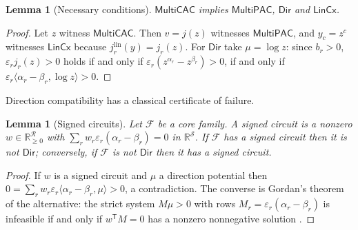 \documentclass[11pt,a4paper]{article}
\theoremstyle{plain}
\newtheorem{lemma}[theorem]{Lemma}
\theoremstyle{definition}
\theoremstyle{remark}
\newcommand{\R}{\mathbb{R}}
\newcommand{\cS}{\mathcal{S}}
\newcommand{\cR}{\mathcal{R}}
\newcommand{\cF}{\mathcal{F}}
\newcommand{\MPAC}{\mathsf{MultiPAC}}
\newcommand{\MCAC}{\mathsf{MultiCAC}}
\newcommand{\DIR}{\mathsf{Dir}}
\newcommand{\LIN}{\mathsf{LinCx}}
\begin{document}
\begin{lemma}[Necessary conditions]\label{lem:necessary}
$\MCAC$ implies $\MPAC$, $\DIR$ and $\LIN$.
\end{lemma}

\begin{proof}
Let $z$ witness $\MCAC$. Then $v=j(z)$ witnesses $\MPAC$, and $y_c=z^{c}$ witnesses $\LIN$ because $j^{\mathrm{lin}}_r(y)=j_r(z)$. For $\DIR$ take $\mu=\log z$: since $b_r>0$, $\varepsilon_rj_r(z)>0$ holds if and only if $\varepsilon_r(z^{\alpha_r}-z^{\beta_r})>0$, if and only if $\varepsilon_r\langle\alpha_r-\beta_r,\log z\rangle>0$.
\end{proof}

Direction compatibility has a classical certificate of failure.

\begin{lemma}[Signed circuits]\label{lem:circuit}
Let $\cF$ be a core family. A \emph{signed circuit} is a nonzero $w\in\R_{\ge0}^{\cR}$ with $\sum_rw_r\varepsilon_r(\alpha_r-\beta_r)=0$ in $\R^{\cS}$. If $\cF$ has a signed circuit then it is not $\DIR$; conversely, if $\cF$ is not $\DIR$ then it has a signed circuit.
\end{lemma}

\begin{proof}
If $w$ is a signed circuit and $\mu$ a direction potential then $0=\sum_rw_r\varepsilon_r\langle\alpha_r-\beta_r,\mu\rangle>0$, a contradiction. The converse is Gordan's theorem of the alternative: the strict system $M\mu>0$ with rows $M_r=\varepsilon_r(\alpha_r-\beta_r)$ is infeasible if and only if $w^{\mathsf T}M=0$ has a nonzero nonnegative solution \citep[Cor.~7.1e]{schrijver1986}.
\end{proof}
\end{document}
